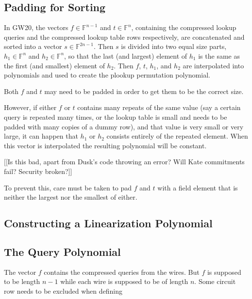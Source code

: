 \documentclass[fleqn]{article}
\begin{document}
		\subsection{Padding for Sorting} %
		In GW20, the vectors $f \in \mathbb{F}^{n-1}$ and $t \in \mathbb{F}^n$, containing the compressed lookup queries and the compressed lookup table rows respectively, are concatenated and sorted into a vector $s \in \mathbb{F}^{2n-1}$. Then $s$ is divided into two equal size parts, $h_1 \in \mathbb{F}^n$ and $h_2 \in \mathbb{F}^n$, so that the last (and largest) element of $h_1$ is the same as the first (and smallest) element of $h_2$. Then $f$, $t$, $h_1$, and $h_2$ are interpolated into polynomials and used to create the plookup permutation polynomial.
		
		Both $f$ and $t$ may need to be padded in order to get them to be the correct size. 
		
		However, if either $f$ or $t$ contains many repeats of the same value (say a certain query is repeated many times, or the lookup table is small and needs to be padded with many copies of a dummy row), and that value is very small or very large, it can happen that $h_1$ or $h_2$ consists entirely of the repeated element. When this vector is interpolated the resulting polynomial will be constant.
		
		[[Is this bad, apart from Dusk's code throwing an error? Will Kate commitments fail? Security broken?]]
		
		To prevent this, care must be taken to pad $f$ and $t$ with a field element that is neither the largest nor the smallest of either.
		
		\subsection{Constructing a Linearization Polynomial} %
		\subsection{The Query Polynomial} %
		
		The vector $f$ contains the compressed queries from the wires. But $f$ is supposed to be length $n-1$ while each wire is supposed to be of length $n$. Some circuit row needs to be excluded when defining 
\end{document}
